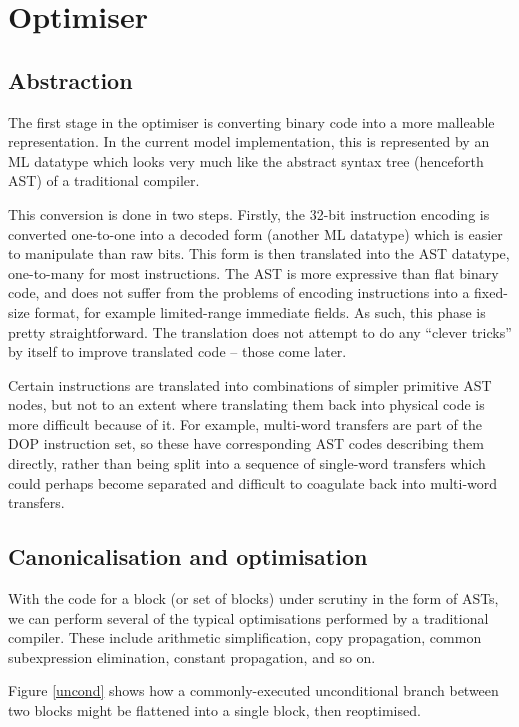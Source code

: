 \documentclass[11pt,letterpaper,twocolumn,notitlepage]{article}
\begin{document}
\section{Optimiser}

\subsection{Abstraction}

The first stage in the optimiser is converting binary code into a more malleable representation. In the current model implementation, this is represented by an ML datatype which looks very much like the abstract syntax tree (henceforth AST) of a traditional compiler.

This conversion is done in two steps. Firstly, the 32-bit instruction encoding is converted one-to-one into a decoded form (another ML datatype) which is easier to manipulate than raw bits. This form is then translated into the AST datatype, one-to-many for most instructions. The AST is more expressive than flat binary code, and does not suffer from the problems of encoding instructions into a fixed-size format, for example limited-range immediate fields. As such, this phase is pretty straightforward. The translation does not attempt to do any ``clever tricks'' by itself to improve translated code -- those come later.

Certain instructions are translated into combinations of simpler primitive AST nodes, but not to an extent where translating them back into physical code is more difficult because of it. For example, multi-word transfers are part of the DOP instruction set, so these have corresponding AST codes describing them directly, rather than being split into a sequence of single-word transfers which could perhaps become separated and difficult to coagulate back into multi-word transfers.

\subsection{Canonicalisation and optimisation}

With the code for a block (or set of blocks) under scrutiny in the form of ASTs, we can perform several of the typical optimisations performed by a traditional compiler. These include arithmetic simplification, copy propagation, common subexpression elimination, constant propagation, and so on.

Figure \ref{uncond} shows how a commonly-executed unconditional branch between two blocks might be flattened into a single block, then reoptimised.
\end{document}
